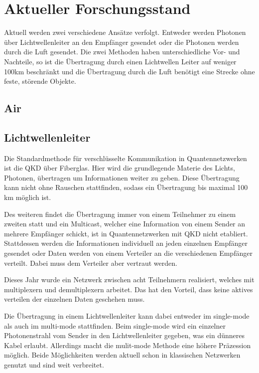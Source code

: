 \chapter{Aktueller Forschungsstand}

Aktuell werden zwei verschiedene Ansätze verfolgt.
Entweder werden Photonen über Lichtwellenleiter an den Empfänger gesendet oder die Photonen werden durch die Luft gesendet.
Die zwei Methoden haben unterschiedliche Vor- und Nachteile, so ist die Übertragung durch einen Lichtwellen Leiter auf weniger 100km beschränkt und die Übertragung durch die Luft benötigt eine Strecke ohne feste, störende Objekte.

\section{Air}
\section{Lichtwellenleiter}

Die Standardmethode für verschlüsselte Kommunikation in Quantennetzwerken ist die \ac{QKD} über Fiberglas.
Hier wird die grundlegende Materie des Lichts, Photonen, übertragen um Informationen weiter zu geben.
Diese Übertragung kann nicht ohne Rauschen stattfinden, sodass ein Übertragung bis maximal 100 km möglich ist\cite{Shen2018}.

Des weiteren findet die Übertragung immer von einem Teilnehmer zu einem zweiten statt und ein Multicast, welcher eine Information von einem Sender an mehrere Empfänger schickt, ist in Quantennetzwerken mit \ac{QKD} nicht etabliert.
Stattdessen werden die Informationen individuell an jeden einzelnen Empfänger gesendet oder Daten werden von einem Verteiler an die verschiedenen Empfänger verteilt.
Dabei muss dem Verteiler aber vertraut werden.

Dieses Jahr wurde ein Netzwerk zwischen acht Teilnehmern realisiert, welches mit multiplexern und demultiplexern arbeitet.
Das hat den Vorteil, dass keine aktives verteilen der einzelnen Daten geschehen muss\cite{Siddarth2020}.

Die Übertragung in einem Lichtwellenleiter kann dabei entweder im single-mode als auch im multi-mode stattfinden.
Beim single-mode wird ein einzelner Photonenstrahl vom Sender in den Lichtwellenleiter gegeben, was ein dünneres Kabel erlaubt.
Allerdings macht die mulit-mode Methode eine höhere Präzession möglich\cite{VanMeter2014}.
Beide Möglichkeiten werden aktuell schon in klassischen Netzwerken genutzt und sind weit verbreitet.

